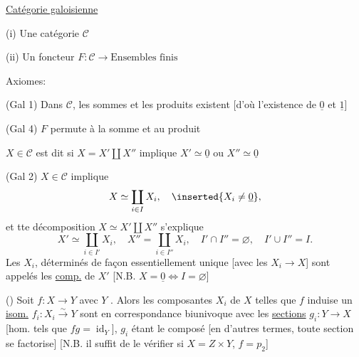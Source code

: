 \uline{Catégorie galoisienne}

(i) Une catégorie $\mathcal C$

(ii) Un foncteur $F:\mathcal C\to\text{Ensembles finis}$

Axiomes:


(Gal 1) Dans $\mathcal C$, les sommes et les produits  existent [d'où l'existence de $\underline0$ et $\underline1$]


(Gal 4) $F$ permute à la somme et au produit

$X\in\mathcal C$ est dit  si $X=X'\amalg X''$ implique $X'\simeq\underline0$ ou $X''\simeq\underline0$

(Gal 2) $X\in\mathcal C$  implique
\[
X\simeq\coprod_{i\in I}X_i,\quad \inserted{X_i\ne\underline0},
\]
et tte décomposition $X\simeq X'\amalg X''$ s'explique
\[
X'\simeq\coprod_{i\in I'}X_i,\quad X''=\coprod_{i\in I''}X_i,\quad
I'\cap I''=\varnothing,\quad I'\cup I''=I.
\]
Les $X_i$, déterminés de façon essentiellement unique [avec les $X_i\to X$] sont appelés les \uline{comp.}  de $X'$ [N.B. $X=\underline0\Longleftrightarrow I=\varnothing$]

() Soit $f:X\to Y$ avec $Y$ .
Alors les composantes  $X_i$ de $X$ telles que $f$ induise un \uline{isom.} $f_i:X_i\overset{\sim}{\longrightarrow}Y$ sont en correspondance biunivoque avec les \uline{sections} $g_i:Y\to X$ 
[hom. tels que $fg=\operatorname{id}_Y$], $g_i$ étant le composé 
[en d'autres termes, toute section se factorise]
[N.B. il suffit de le vérifier si $X=Z\times Y$, $f=p_2$]

